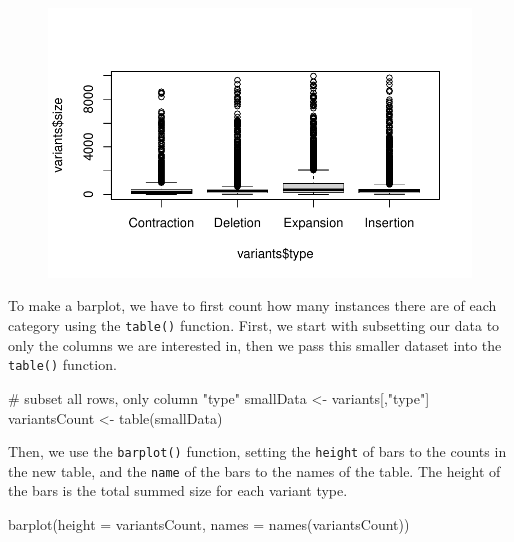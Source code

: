 \documentclass[
  letterpaper,
  DIV=11,
  numbers=noendperiod]{scrreprt}
\newenvironment{Shaded}{\begin{snugshade}}{\end{snugshade}}
\newcommand{\AttributeTok}[1]{\textcolor[rgb]{0.40,0.45,0.13}{#1}}
\newcommand{\CommentTok}[1]{\textcolor[rgb]{0.37,0.37,0.37}{#1}}
\newcommand{\FunctionTok}[1]{\textcolor[rgb]{0.28,0.35,0.67}{#1}}
\newcommand{\NormalTok}[1]{\textcolor[rgb]{0.00,0.23,0.31}{#1}}
\newcommand{\OtherTok}[1]{\textcolor[rgb]{0.00,0.23,0.31}{#1}}
\newcommand{\StringTok}[1]{\textcolor[rgb]{0.13,0.47,0.30}{#1}}
\begin{document}
\begin{figure}[H]

{\centering \includegraphics{scripts/02_dataViz/class3_files/figure-pdf/unnamed-chunk-16-1.pdf}

}

\end{figure}

To make a barplot, we have to first count how many instances there are
of each category using the \texttt{table()} function. First, we start
with subsetting our data to only the columns we are interested in, then
we pass this smaller dataset into the \texttt{table()} function.

\begin{Shaded}
\begin{Highlighting}[]
\CommentTok{\# subset all rows, only column "type"}
\NormalTok{smallData }\OtherTok{\textless{}{-}}\NormalTok{ variants[,}\StringTok{"type"}\NormalTok{]}
\NormalTok{variantsCount }\OtherTok{\textless{}{-}} \FunctionTok{table}\NormalTok{(smallData)}
\end{Highlighting}
\end{Shaded}

Then, we use the \texttt{barplot()} function, setting the
\texttt{height} of bars to the counts in the new table, and the
\texttt{name} of the bars to the names of the table. The height of the
bars is the total summed size for each variant type.

\begin{Shaded}
\begin{Highlighting}[]
\FunctionTok{barplot}\NormalTok{(}\AttributeTok{height =}\NormalTok{ variantsCount, }\AttributeTok{names =} \FunctionTok{names}\NormalTok{(variantsCount))}
\end{Highlighting}
\end{Shaded}
\end{document}
